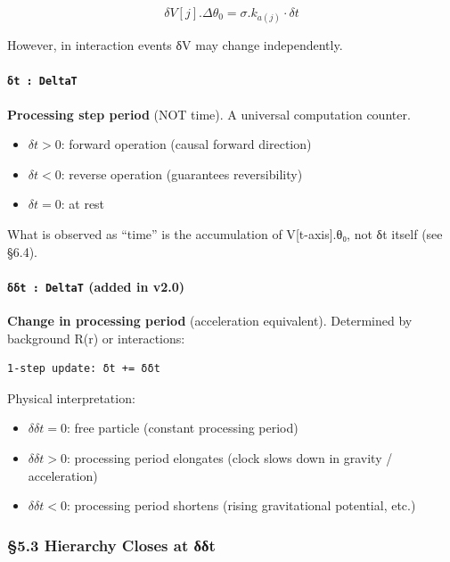 \documentclass[a4paper,11pt]{article}
\providecommand{\tightlist}{\setlength{\itemsep}{0pt}\setlength{\parskip}{0pt}}
\begin{document}
\[\delta V[j].\Delta\theta_0 = \sigma.k_{a(j)} \cdot \delta t\]

However, in interaction events δV may change independently.

\paragraph{\texorpdfstring{\texttt{δt\ :\ DeltaT}}{δt : DeltaT}}\label{ux3b4t-deltat}

\textbf{Processing step period} (NOT time). A universal computation
counter.

\begin{itemize}
\tightlist
\item
  \(\delta t > 0\): forward operation (causal forward direction)
\item
  \(\delta t < 0\): reverse operation (guarantees reversibility)
\item
  \(\delta t = 0\): at rest
\end{itemize}

What is observed as ``time'' is the accumulation of V{[}t-axis{]}.θ₀,
not δt itself (see §6.4).

\paragraph{\texorpdfstring{\texttt{δδt\ :\ DeltaT} (added in
v2.0)}{δδt : DeltaT (added in v2.0)}}\label{ux3b4ux3b4t-deltat-added-in-v2.0}

\textbf{Change in processing period} (acceleration equivalent).
Determined by background R(r) or interactions:

\begin{verbatim}
1-step update: δt += δδt
\end{verbatim}

Physical interpretation:

\begin{itemize}
\tightlist
\item
  \(\delta\delta t = 0\): free particle (constant processing period)
\item
  \(\delta\delta t > 0\): processing period elongates (clock slows down
  in gravity / acceleration)
\item
  \(\delta\delta t < 0\): processing period shortens (rising
  gravitational potential, etc.)
\end{itemize}

\subsubsection{§5.3 Hierarchy Closes at
δδt}\label{hierarchy-closes-at-ux3b4ux3b4t}
\end{document}
